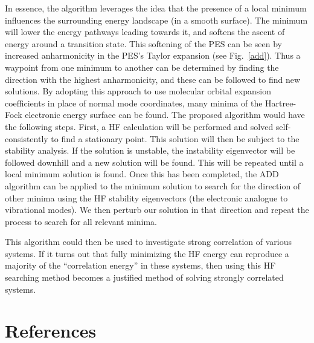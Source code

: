 \documentclass{revtex4}
\begin{document}
    In essence, the algorithm leverages the idea that the 
    presence of a local minimum influences the surrounding energy landscape (in a smooth surface). 
    The minimum will lower the energy pathways leading towards it, and softens the ascent of energy 
    around a transition state. This softening of the PES can be seen by increased anharmonicity in 
    the PES's Taylor expansion (see Fig.~\ref{add}). Thus a waypoint from one minimum to another 
    can 
    be determined by 
    finding the direction with the highest anharmonicity, and these can be followed to find new 
    solutions. By adopting this approach to use 
    molecular orbital expansion 
    coefficients in place of normal mode coordinates, many minima of the Hartree-Fock electronic 
    energy surface can be found. The proposed algorithm would have the following steps. First, a HF 
    calculation will be performed and solved self-consistently to find a stationary point. This 
    solution will then be subject to the stability analysis. If the solution is unstable, the 
    instability eigenvector will be followed downhill and a new solution will be found. This will 
    be repeated until a local minimum solution is found. Once this has been completed, the ADD 
    algorithm can be applied to the minimum solution to search for the direction of other minima 
    using the HF stability eigenvectors (the electronic analogue to vibrational modes). We then 
    perturb our solution in that direction and repeat the process to search for all relevant 
    minima. 
    
    This algorithm could then be used to investigate strong correlation of various systems. If it 
    turns out that fully minimizing the HF energy can reproduce a majority of the ``correlation 
    energy'' in these systems, then using this HF searching method becomes a justified method of 
    solving strongly correlated systems. 
       
      
\newpage
\section{References}

\end{document}
